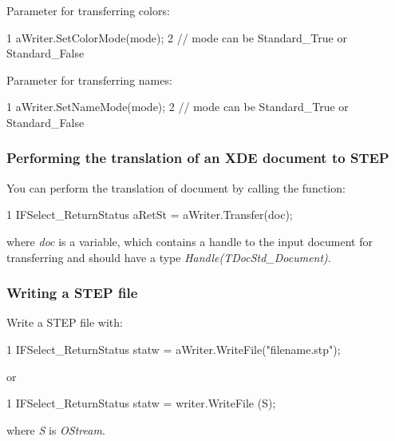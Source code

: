 \begin{DoxyItemize}
\item Parameter for transferring colors\+: 
\begin{DoxyCode}
1 aWriter.SetColorMode(mode); 
2 // mode can be Standard\_True or Standard\_False 
\end{DoxyCode}

\item Parameter for transferring names\+: 
\begin{DoxyCode}
1 aWriter.SetNameMode(mode); 
2 // mode can be Standard\_True or Standard\_False 
\end{DoxyCode}
 
\end{DoxyItemize}\hypertarget{occt_user_guides__step_occt_step_7_1_7}{}\subsubsection{Performing the translation of an X\+D\+E document to S\+T\+EP}\label{occt_user_guides__step_occt_step_7_1_7}
You can perform the translation of document by calling the function\+: 
\begin{DoxyCode}
1 IFSelect\_ReturnStatus aRetSt = aWriter.Transfer(doc); 
\end{DoxyCode}
 where {\itshape doc} is a variable, which contains a handle to the input document for transferring and should have a type {\itshape Handle(\+T\+Doc\+Std\+\_\+\+Document)}.\hypertarget{occt_user_guides__step_occt_step_7_18}{}\subsubsection{Writing a S\+T\+E\+P file}\label{occt_user_guides__step_occt_step_7_18}
Write a S\+T\+EP file with\+: 
\begin{DoxyCode}
1 IFSelect\_ReturnStatus statw = aWriter.WriteFile("filename.stp"); 
\end{DoxyCode}
 or 
\begin{DoxyCode}
1 IFSelect\_ReturnStatus statw = writer.WriteFile (S); 
\end{DoxyCode}
 where {\itshape S} is {\itshape O\+Stream}. 
